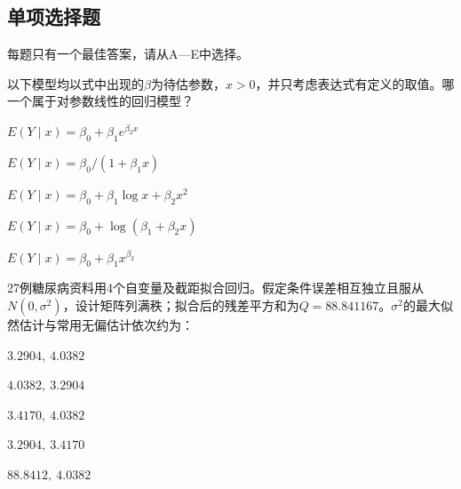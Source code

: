 \subsection{单项选择题}
每题只有一个最佳答案，请从A—E中选择。

\par\noindent\begin{minipage}{\linewidth}
以下模型均以式中出现的$\beta$为待估参数，$x>0$，并只考虑表达式有定义的取值。哪一个属于对参数线性的回归模型？
\begin{choices}
\item $E(Y\mid x)=\beta_0+\beta_1e^{\beta_2x}$
\item $E(Y\mid x)=\beta_0/(1+\beta_1x)$
\item $E(Y\mid x)=\beta_0+\beta_1\log x+\beta_2x^2$
\item $E(Y\mid x)=\beta_0+\log(\beta_1+\beta_2x)$
\item $E(Y\mid x)=\beta_0+\beta_1x^{\beta_2}$
\end{choices}
\end{minipage}\par\medskip

\par\noindent\begin{minipage}{\linewidth}
27例糖尿病资料用4个自变量及截距拟合回归。假定条件误差相互独立且服从$N(0,\sigma^2)$，设计矩阵列满秩；拟合后的残差平方和为$Q=88.841167$。$\sigma^2$的最大似然估计与常用无偏估计依次约为：
\begin{choices}
\item $3.2904,\ 4.0382$
\item $4.0382,\ 3.2904$
\item $3.4170,\ 4.0382$
\item $3.2904,\ 3.4170$
\item $88.8412,\ 4.0382$
\end{choices}
\end{minipage}\par\medskip

